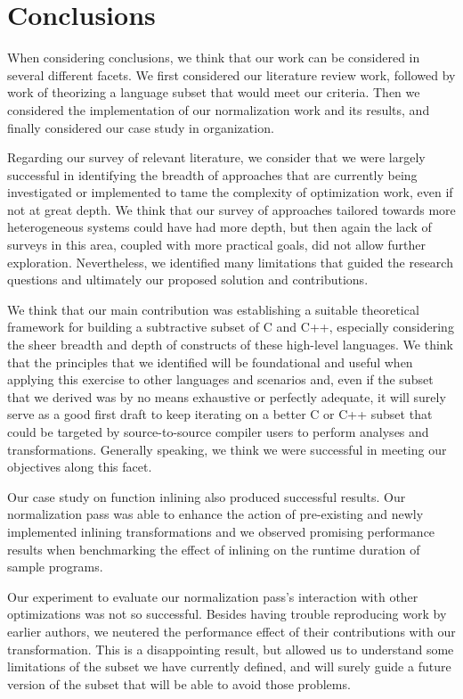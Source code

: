 \chapter{Conclusions}\label{chap:conclusions}

When considering conclusions, we think that our work can be considered in several different facets. We first considered our literature review work, followed by work of theorizing a language subset that would meet our criteria. Then we considered the implementation of our normalization work and its results, and finally considered our case study in organization.

Regarding our survey of relevant literature, we consider that we were largely successful in identifying the breadth of approaches that are currently being investigated or implemented to tame the complexity of optimization work, even if not at great depth. We think that our survey of approaches tailored towards more heterogeneous systems could have had more depth, but then again the lack of surveys in this area, coupled with more practical goals, did not allow further exploration. Nevertheless, we identified many limitations that guided the research questions and ultimately our proposed solution and contributions.

We think that our main contribution was establishing a suitable theoretical framework for building a subtractive subset of C and C++, especially considering the sheer breadth and depth of constructs of these high-level languages. We think that the principles that we identified will be foundational and useful when applying this exercise to other languages and scenarios and, even if the subset that we derived was by no means exhaustive or perfectly adequate, it will surely serve as a good first draft to keep iterating on a better C or C++ subset that could be targeted by source-to-source compiler users to perform analyses and transformations. Generally speaking, we think we were successful in meeting our objectives along this facet.

Our case study on function inlining also produced successful results. Our normalization pass was able to enhance the action of pre-existing and newly implemented inlining transformations and we observed promising performance results when benchmarking the effect of inlining on the runtime duration of sample programs.

Our experiment to evaluate our normalization pass's interaction with other optimizations was not so successful. Besides having trouble reproducing work by earlier authors, we neutered the performance effect of their contributions with our transformation. This is a disappointing result, but allowed us to understand some limitations of the subset we have currently defined, and will surely guide a future version of the subset that will be able to avoid those problems.

